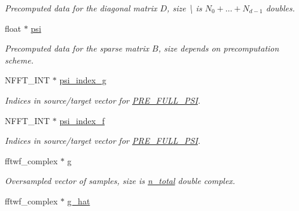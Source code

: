 \begin{DoxyCompactItemize}
\begin{DoxyCompactList}\small\item\em Precomputed data for the diagonal matrix $D$, size \textbackslash{} is $N_0+\dots+N_{d-1}$ doubles. \end{DoxyCompactList}\item 
\hypertarget{structnfftf__plan_a84402b4c947d57abef20e5f2db9110e3}{float $\ast$ \hyperlink{structnfftf__plan_a84402b4c947d57abef20e5f2db9110e3}{psi}}\label{structnfftf__plan_a84402b4c947d57abef20e5f2db9110e3}

\begin{DoxyCompactList}\small\item\em Precomputed data for the sparse matrix $B$, size depends on precomputation scheme. \end{DoxyCompactList}\item 
\hypertarget{structnfftf__plan_a4c43237e22be0ab7fb31d3b43a54d24e}{N\-F\-F\-T\-\_\-\-I\-N\-T $\ast$ \hyperlink{structnfftf__plan_a4c43237e22be0ab7fb31d3b43a54d24e}{psi\-\_\-index\-\_\-g}}\label{structnfftf__plan_a4c43237e22be0ab7fb31d3b43a54d24e}

\begin{DoxyCompactList}\small\item\em Indices in source/target vector for \hyperlink{group__nfft_ga7ad8a7e19519b16340dabec48899c6a4}{P\-R\-E\-\_\-\-F\-U\-L\-L\-\_\-\-P\-S\-I}. \end{DoxyCompactList}\item 
\hypertarget{structnfftf__plan_a16d718e2afbc19fd9a1e6fc56e082d9f}{N\-F\-F\-T\-\_\-\-I\-N\-T $\ast$ \hyperlink{structnfftf__plan_a16d718e2afbc19fd9a1e6fc56e082d9f}{psi\-\_\-index\-\_\-f}}\label{structnfftf__plan_a16d718e2afbc19fd9a1e6fc56e082d9f}

\begin{DoxyCompactList}\small\item\em Indices in source/target vector for \hyperlink{group__nfft_ga7ad8a7e19519b16340dabec48899c6a4}{P\-R\-E\-\_\-\-F\-U\-L\-L\-\_\-\-P\-S\-I}. \end{DoxyCompactList}\item 
\hypertarget{structnfftf__plan_a35e6b39bfe06e5a6e56cde2458cf79a7}{fftwf\-\_\-complex $\ast$ \hyperlink{structnfftf__plan_a35e6b39bfe06e5a6e56cde2458cf79a7}{g}}\label{structnfftf__plan_a35e6b39bfe06e5a6e56cde2458cf79a7}

\begin{DoxyCompactList}\small\item\em Oversampled vector of samples, size is \hyperlink{structnfftf__plan_a4a8cde81c6ece514d2b36b46aa998842}{n\-\_\-total} double complex. \end{DoxyCompactList}\item 
\hypertarget{structnfftf__plan_aad01cb28079405090eaa1fce590c0c09}{fftwf\-\_\-complex $\ast$ \hyperlink{structnfftf__plan_aad01cb28079405090eaa1fce590c0c09}{g\-\_\-hat}}\label{structnfftf__plan_aad01cb28079405090eaa1fce590c0c09}


\end{DoxyCompactItemize}
